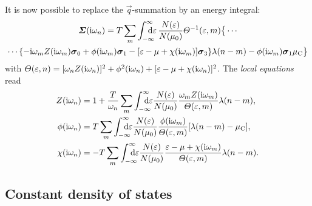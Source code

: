 It is now possible to replace the $\vec q$-summation by an energy integral:
%
\begin{multline} \label{local self-energy}
    \vec \Sigma(\I \omega_n)
    = T \sum_m \int \from{-\infty} \till \infty \D \epsilon \,
    \frac{N(\epsilon)}{N(\mu_0)}
    \Theta^{-1}(\epsilon, m) \big \{ \cdots
        \\
        \cdots \{
            - \I \omega_m Z(\I \omega_m) \vec \sigma_0
            + \phi(\I \omega_m) \vec \sigma_1
            - [\epsilon - \mu + \chi(\I \omega_m)] \vec \sigma_3
            \}
        \lambda(n - m) - \phi(\I \omega_m) \vec \sigma_1 \mu \sub C
    \big \}
\end{multline}
%
with $\varTheta(\varepsilon, n) = [\omega_n Z(\mathrm i \omega_n)]^2 + \phi^2(\mathrm i \omega_n) +
[\varepsilon - \mu + \chi(\mathrm i \omega_n)]^2$. The \emph{local 
equations} read
%
\begin{subequations} \label{local Eliashberg equations}
    \begin{align}
        Z(\I \omega_n) &= 1 + \frac T {\omega_n} \sum_m
        \int \from{-\infty} \till \infty \D \epsilon
        \frac{N(\epsilon)}{N(\mu_0)}
        \frac{\omega_m Z(\I \omega_m)}{\Theta(\epsilon, m)}
        \lambda(n - m),
        \\
        \phi(\I \omega_n) &= T \sum_m
        \int \from{-\infty} \till \infty \D \epsilon
        \frac{N(\epsilon)}{N(\mu_0)}
        \frac{\phi(\I \omega_m)}{\Theta(\epsilon, m)}
        [\lambda(n - m) - \mu \sub C],
        \\
        \chi(\I \omega_n) &= -T \sum_m
        \int \from{-\infty} \till \infty \D \epsilon
        \frac{N(\epsilon)}{N(\mu_0)}
        \frac{\epsilon - \mu + \chi(\I \omega_m)}{\Theta(\epsilon, m)}
        \lambda(n - m).
    \end{align}
\end{subequations}

\subsection{Constant density of states}


